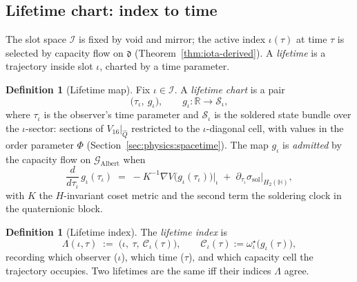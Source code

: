 \documentclass[aps,prd,onecolumn,amsmath,amssymb,nofootinbib,11pt]{revtex4-2}
\numberwithin{equation}{section}
\theoremstyle{plain}
\theoremstyle{definition}
\newtheorem{definition}[theorem]{Definition}
\theoremstyle{remark}
\newcommand{\Quat}{\mathbb{H}}
\newcommand{\capacity}{\mathcal{C}}
\newcommand{\orderparam}{\Phi}
\begin{document}
\subsection{Lifetime chart: index to time}
\label{sec:observer:lifetime}

The slot space $\mathcal{I}$ is fixed by void and mirror; the active index
$\iota(\tau)$ at time $\tau$ is selected by capacity flow on $\mathfrak{d}$
(Theorem~\ref{thm:iota-derived}). A \emph{lifetime} is a trajectory inside
slot $\iota$, charted by a time parameter.

\begin{definition}[Lifetime map]\label{def:lifetime}
Fix $\iota\in\mathcal{I}$. A \emph{lifetime chart} is a pair
\begin{equation}\label{eq:lifetime-chart}
  \bigl(\tau_\iota,\ g_\iota\bigr),
  \qquad
  g_\iota:\mathbb{R}\longrightarrow \mathcal{S}_\iota,
\end{equation}
where $\tau_\iota$ is the observer's time parameter and $\mathcal{S}_\iota$ is
the soldered state bundle over the $\iota$-sector: sections of
$V_{16}|_{\hat Q}$ restricted to the $\iota$-diagonal cell, with values in the
order parameter $\orderparam$ (Section~\ref{sec:physics:spacetime}).
The map $g_\iota$ is \emph{admitted} by the capacity flow on
$\mathcal{G}_{\mathrm{Albert}}$ when
\begin{equation}\label{eq:lifetime-admitted}
  \frac{d}{d\tau_\iota}\, g_\iota(\tau_\iota)
  \;=\;
  -K^{-1}\nabla V\bigl(g_\iota(\tau_\iota)\bigr)\big|_{\iota}
  \;+\;
  \partial_{\tau_\iota}\sigma_{\mathrm{sol}}\big|_{H_2(\Quat)},
\end{equation}
with $K$ the $H$-invariant coset metric and the second term the soldering
clock in the quaternionic block.
\end{definition}

\begin{definition}[Lifetime index]\label{def:lifetime-index}
The \emph{lifetime index} is
\begin{equation}\label{eq:lifetime-index}
  \Lambda(\iota,\tau) \;:=\; \bigl(\iota,\ \tau,\ \capacity_\iota(\tau)\bigr),
  \qquad
  \capacity_\iota(\tau):=\omega^\star_\iota\bigl(g_\iota(\tau)\bigr),
\end{equation}
recording which observer ($\iota$), which time ($\tau$), and which capacity
cell the trajectory occupies. Two lifetimes are the same iff their indices
$\Lambda$ agree.
\end{definition}
\end{document}
